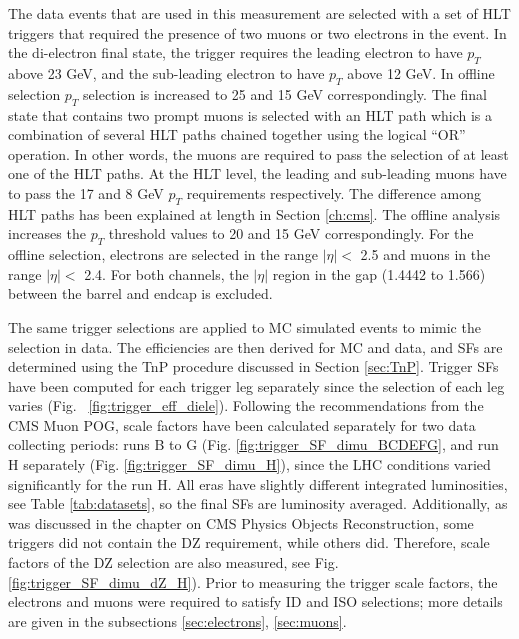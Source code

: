 The data events that are used in this measurement are selected with a set of HLT triggers that required the presence of two muons or two electrons in the event. In the di-electron final state, the trigger requires the leading electron to have $p_T$ above 23 GeV, and the sub-leading electron to have $p_T$ above 12 GeV. In offline selection $p_T$ selection is increased to 25 and 15 GeV correspondingly. %
The final state that contains two prompt muons is selected with an HLT path which is a combination of several HLT paths chained together using the logical ``OR'' operation. In other words, the muons are required to pass the selection of at least one of the HLT paths. At the HLT level, the leading and sub-leading muons have to pass the 17 and 8 GeV $p_T$ requirements respectively. The difference among HLT paths has been explained at length in Section \ref{ch:cms}. The offline analysis increases the $p_T$ threshold values to 20 and 15 GeV correspondingly. For the offline selection, electrons are selected in the range $|\eta| < $ 2.5 and muons in the range $|\eta| < $ 2.4. For both channels, the $|\eta|$ region in the gap (1.4442 to 1.566) between the barrel and endcap is excluded.

The same trigger selections are applied to MC simulated events to mimic the selection in data. The efficiencies are then derived for MC and data, and SFs are determined using the TnP procedure discussed in Section \ref{sec:TnP}. Trigger SFs have been computed for each trigger leg separately since the selection of each leg varies (Fig. ~\ref{fig:trigger_eff_diele}). Following the recommendations from the CMS Muon POG, scale factors have been calculated separately for two data collecting periods: runs B to G (Fig. \ref{fig:trigger_SF_dimu_BCDEFG}, and run H separately (Fig. \ref{fig:trigger_SF_dimu_H}), since the LHC conditions varied significantly for the run H. All eras have slightly different integrated luminosities, see Table \ref{tab:datasets}, so the final SFs are luminosity averaged. Additionally, as was discussed in the chapter on CMS Physics Objects Reconstruction, some triggers did not contain the DZ requirement, while others did. Therefore, scale factors of the DZ selection are also measured, see Fig. \ref{fig:trigger_SF_dimu_dZ_H}). Prior to measuring the trigger scale factors, the electrons and muons were required to satisfy ID and ISO selections; more details are given in the subsections \ref{sec:electrons}, \ref{sec:muons}. 

